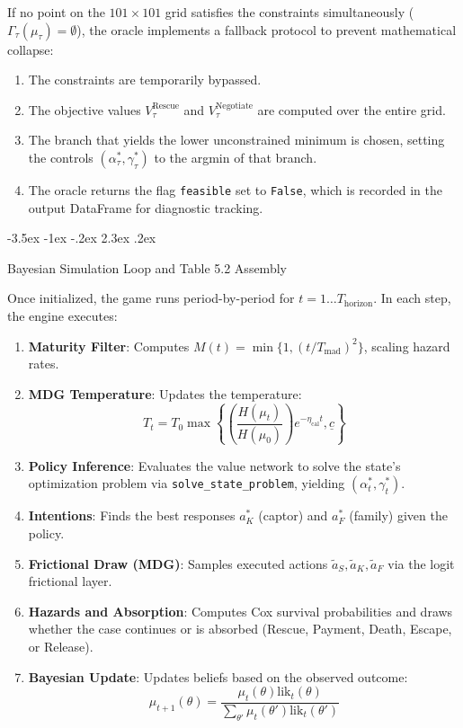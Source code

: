 \documentclass[12pt]{article}
\makeatletter
\newcommand{\pyvar}[1]{\texttt{#1}}
\numberwithin{equation}{section}
\numberwithin{table}{section}
\renewcommand\section{\@startsection {section}{1}{\z@}%
                                   {-3.5ex \@plus -1ex \@minus -.2ex}%
                                   {2.3ex \@plus.2ex}%
                                   {\normalfont\Large\bfseries\raggedright}}
\makeatother
\begin{document}
If no point on the $101 \times 101$ grid satisfies the constraints simultaneously ($\Gamma_\tau(\mu_\tau) = \emptyset$), the oracle implements a fallback protocol to prevent mathematical collapse:
\begin{enumerate}
    \item The constraints are temporarily bypassed.
    \item The objective values $V_\tau^{\text{Rescue}}$ and $V_\tau^{\text{Negotiate}}$ are computed over the entire grid.
    \item The branch that yields the lower unconstrained minimum is chosen, setting the controls $(\alpha_\tau^\ast, \gamma_\tau^\ast)$ to the argmin of that branch.
    \item The oracle returns the flag \pyvar{feasible} set to \pyvar{False}, which is recorded in the output DataFrame for diagnostic tracking.
\end{enumerate}

\section{Bayesian Simulation Loop and Table 5.2 Assembly}

Once initialized, the game runs period-by-period for $t = 1 \dots T_{\text{horizon}}$. In each step, the engine executes:
\begin{enumerate}
    \item \textbf{Maturity Filter}: Computes $M(t) = \min\{1, (t/T_{\text{mad}})^2\}$, scaling hazard rates.
    \item \textbf{MDG Temperature}: Updates the temperature:
    \[ T_t = T_0 \max\left\{ \left(\frac{H(\mu_t)}{H(\mu_0)}\right) e^{-\eta_{\text{cal}} t}, \underline{c} \right\} \]
    \item \textbf{Policy Inference}: Evaluates the value network to solve the state's optimization problem via \pyvar{solve\_state\_problem}, yielding $(\alpha_t^\ast, \gamma_t^\ast)$.
    \item \textbf{Intentions}: Finds the best responses $a_K^\ast$ (captor) and $a_F^\ast$ (family) given the policy.
    \item \textbf{Frictional Draw (MDG)}: Samples executed actions $\tilde{a}_S, \tilde{a}_K, \tilde{a}_F$ via the logit frictional layer.
    \item \textbf{Hazards and Absorption}: Computes Cox survival probabilities and draws whether the case continues or is absorbed (Rescue, Payment, Death, Escape, or Release).
    \item \textbf{Bayesian Update}: Updates beliefs based on the observed outcome:
    \begin{equation}
    \mu_{t+1}(\theta) = \frac{\mu_t(\theta) \text{lik}_t(\theta)}{\sum_{\theta'} \mu_t(\theta') \text{lik}_t(\theta')}
    \end{equation}
\end{enumerate}
\end{document}
